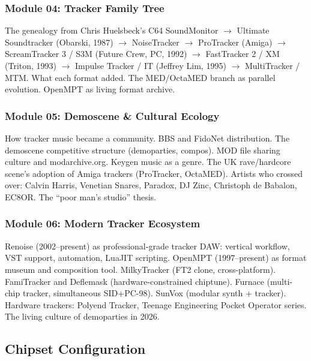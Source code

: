 \documentclass[11pt,letterpaper]{article}
\begin{document}
\subsubsection{Module 04: Tracker Family Tree}
The genealogy from Chris Huelsbeck's C64 SoundMonitor $\to$ Ultimate Soundtracker (Obarski, 1987) $\to$ NoiseTracker $\to$ ProTracker (Amiga) $\to$ ScreamTracker 3 / S3M (Future Crew, PC, 1992) $\to$ FastTracker 2 / XM (Triton, 1993) $\to$ Impulse Tracker / IT (Jeffrey Lim, 1995) $\to$ MultiTracker / MTM. What each format added. The MED/OctaMED branch as parallel evolution. OpenMPT as living format archive.

\subsubsection{Module 05: Demoscene \& Cultural Ecology}
How tracker music became a community. BBS and FidoNet distribution. The demoscene competitive structure (demoparties, compos). MOD file sharing culture and modarchive.org. Keygen music as a genre. The UK rave/hardcore scene's adoption of Amiga trackers (ProTracker, OctaMED). Artists who crossed over: Calvin Harris, Venetian Snares, Paradox, DJ Zinc, Christoph de Babalon, EC8OR. The ``poor man's studio'' thesis.

\subsubsection{Module 06: Modern Tracker Ecosystem}
Renoise (2002--present) as professional-grade tracker DAW: vertical workflow, VST support, automation, LuaJIT scripting. OpenMPT (1997--present) as format museum and composition tool. MilkyTracker (FT2 clone, cross-platform). FamiTracker and Deflemask (hardware-constrained chiptune). Furnace (multi-chip tracker, simultaneous SID+PC-98). SunVox (modular synth + tracker). Hardware trackers: Polyend Tracker, Teenage Engineering Pocket Operator series. The living culture of demoparties in 2026.

\subsection{Chipset Configuration}
\end{document}
